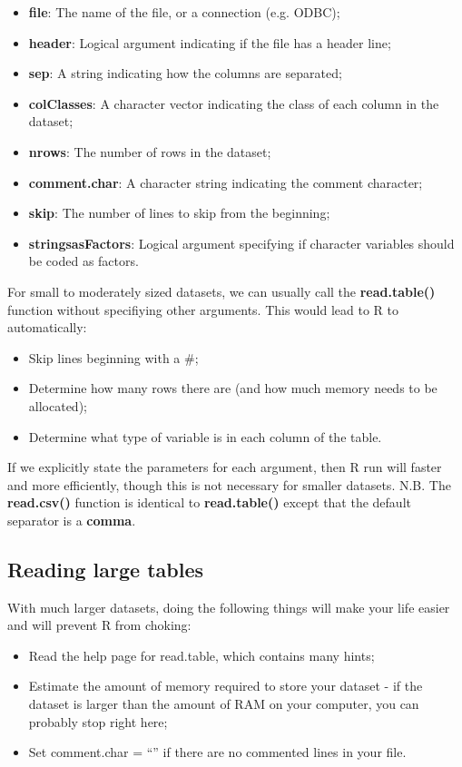 \documentclass[10pt,a4paper,twoside]{article}\usepackage[]{graphicx}\usepackage[]{xcolor}
\begin{document}
\begin{itemize}
  \item \textbf{file}: The name of the file, or a connection (e.g. ODBC);
  \item \textbf{header}: Logical argument indicating if the file has a header line;
  \item \textbf{sep}: A string indicating how the columns are separated;
  \item \textbf{colClasses}: A character vector indicating the class of each column in the dataset;
  \item \textbf{nrows}: The number of rows in the dataset;
  \item \textbf{comment.char}: A character string indicating the comment character;
  \item \textbf{skip}: The number of lines to skip from the beginning;
  \item \textbf{stringsasFactors}: Logical argument specifying if character variables should be coded as factors.
\end{itemize}

For small to moderately sized datasets, we can usually call the \textbf{read.table()} function without specifiying other arguments. This would lead to R to automatically:

\begin{itemize}
  \item Skip lines beginning with a $\#$;
  \item Determine how many rows there are (and how much memory needs to be allocated);
  \item Determine what type of variable is in each column of the table.
\end{itemize}

If we explicitly state the parameters for each argument, then R run will faster and more efficiently, though this is not necessary for smaller datasets. N.B. The \textbf{read.csv()} function is identical to \textbf{read.table()} except that the default separator is a \textbf{comma}.

\subsection{Reading large tables}

With much larger datasets, doing the following things will make your life easier and will prevent R from choking:

\begin{itemize}
  \item Read the help page for read.table, which contains many hints;
  \item Estimate the amount of memory required to store your dataset - if the dataset is larger than the amount of RAM on your computer, you can probably stop right here;
  \item Set comment.char = ``'' if there are no commented lines in your file.
\end{itemize}
\end{document}
